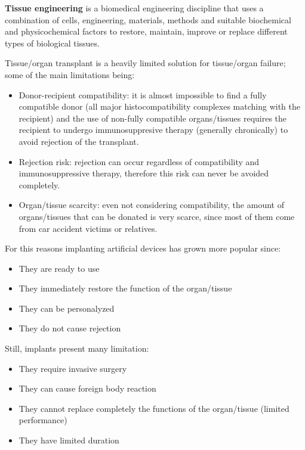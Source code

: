 \textbf{Tissue engineering} is a biomedical engineering discipline that uses a combination of cells, engineering, materials, methods and suitable biochemical and physicochemical factors to restore, maintain, improve or replace different types of biological tissues.


Tissue/organ transplant is a heavily limited solution for tissue/organ failure; some of the main limitations being:
\begin{itemize}
  \item Donor-recipient compatibility: it is almost impossible to find a fully compatible donor (all major histocompatibility complexes matching with the recipient) and the use of non-fully compatible organs/tissues requires the recipient to undergo immunosuppresive therapy (generally chronically) to avoid rejection of the transplant. 
  \item Rejection risk: rejection can occur regardless of compatibility and immunosuppressive therapy, therefore this risk can never be avoided completely.
  \item Organ/tissue scarcity: even not considering compatibility, the amount of organs/tissues that can be donated is very scarce, since most of them come from car accident victims or relatives. 
\end{itemize}
For this reasons implanting artificial devices has grown more popular since:
\begin{itemize}
  \item They are ready to use
  \item They immediately restore the function of the organ/tissue
  \item They can be personalyzed
  \item They do not cause rejection
\end{itemize}
Still, implants present many limitation:
\begin{itemize}
  \item They require invasive surgery
  \item They can cause foreign body reaction 
  \item They cannot replace completely the functions of the organ/tissue (limited performance)
  \item They have limited duration
\end{itemize}

